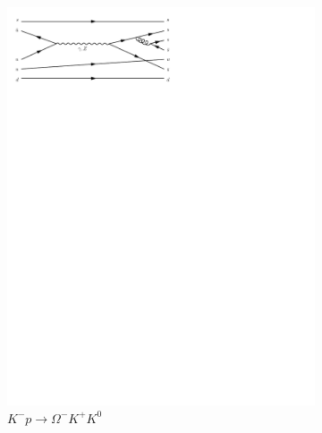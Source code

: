 \begin{figure}[h]
\begin{subfigure}[b]{0.3\textwidth}
    \includegraphics[trim={0.5cm 22cm 10cm 0cm},width=\textwidth]{../Diagrams/D6.pdf}
    \caption{$K^-p \rightarrow \Omega^-K^+K^0$}
    \label{fey:6}
  \end{subfigure}
  \newline
  \newline
  \begin{subfigure}[b]{0.3\textwidth}

\end{subfigure}
\end{figure}
